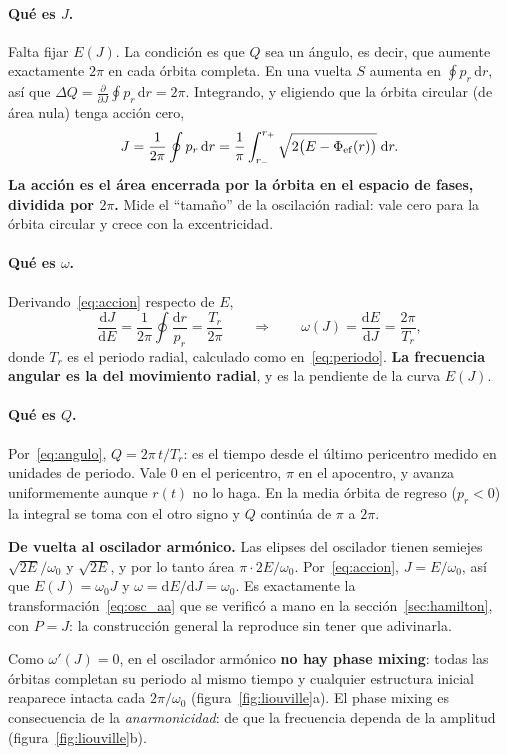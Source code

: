 \documentclass[11pt,a4paper]{article}
\newcommand{\dd}{\mathrm{d}}
\newcommand{\rp}{p_r}
\newcommand{\Jr}{J}
\newcommand{\Qr}{Q}
\theoremstyle{definition}
\begin{document}
\paragraph{Qué es $\Jr$.} Falta fijar $E(\Jr)$. La condición es que $\Qr$ sea un
ángulo, es decir, que aumente exactamente $2\pi$ en cada órbita completa. En una
vuelta $S$ aumenta en $\oint\rp\,\dd r$, así que
$\Delta\Qr = \frac{\partial}{\partial\Jr}\oint\rp\,\dd r = 2\pi$. Integrando, y
eligiendo que la órbita circular (de área nula) tenga acción cero,
\begin{equation}
  \Jr = \frac{1}{2\pi}\oint \rp\,\dd r
      = \frac{1}{\pi}\int_{r_-}^{r_+}\sqrt{2\big(E-\Phi_{\rm ef}(r)\big)}\;\dd r .
  \label{eq:accion}
\end{equation}
\textbf{La acción es el área encerrada por la órbita en el espacio de fases,
dividida por $2\pi$.} Mide el ``tamaño'' de la oscilación radial: vale cero para la
órbita circular y crece con la excentricidad.

\paragraph{Qué es $\omega$.} Derivando~\eqref{eq:accion} respecto de $E$,
\begin{equation}
  \frac{\dd\Jr}{\dd E} = \frac{1}{2\pi}\oint\frac{\dd r}{\rp} = \frac{T_r}{2\pi}
  \qquad\Longrightarrow\qquad
  \omega(\Jr) = \frac{\dd E}{\dd\Jr} = \frac{2\pi}{T_r} ,
  \label{eq:omegaT}
\end{equation}
donde $T_r$ es el periodo radial, calculado como en~\eqref{eq:periodo}. \textbf{La frecuencia angular es la del
movimiento radial}, y es la pendiente de la curva $E(\Jr)$.

\paragraph{Qué es $\Qr$.} Por~\eqref{eq:angulo}, $\Qr=2\pi\,t/T_r$: es el tiempo
desde el último pericentro medido en unidades de periodo. Vale $0$ en el pericentro,
$\pi$ en el apocentro, y avanza uniformemente aunque $r(t)$ no lo haga. En la media
órbita de regreso ($\rp<0$) la integral se toma con el otro signo y $\Qr$ continúa
de $\pi$ a $2\pi$.

\begin{idea}
\textbf{De vuelta al oscilador armónico.} Las elipses del oscilador tienen semiejes
$\sqrt{2E}/\omega_0$ y $\sqrt{2E}$, y por lo tanto área $\pi\cdot2E/\omega_0$.
Por~\eqref{eq:accion}, $\Jr=E/\omega_0$, así que $E(\Jr)=\omega_0\Jr$ y
$\omega=\dd E/\dd\Jr=\omega_0$. Es exactamente la transformación~\eqref{eq:osc_aa}
que se verificó a mano en la sección~\ref{sec:hamilton}, con $P=\Jr$: la
construcción general la reproduce sin tener que adivinarla.

Como $\omega'(\Jr)=0$, en el oscilador armónico \textbf{no hay phase mixing}: todas
las órbitas completan su periodo al mismo tiempo y cualquier estructura inicial
reaparece intacta cada $2\pi/\omega_0$ (figura~\ref{fig:liouville}a). El phase mixing
es consecuencia de la \emph{anarmonicidad}: de que la frecuencia dependa de la
amplitud (figura~\ref{fig:liouville}b).
\end{idea}
\end{document}
